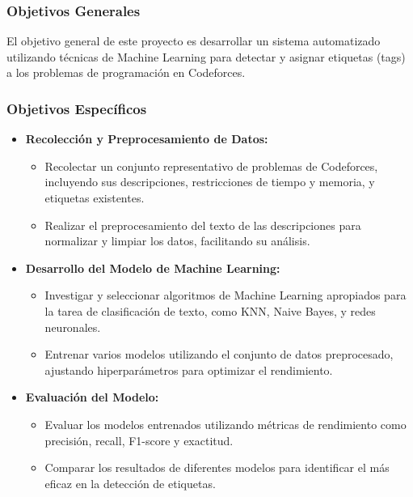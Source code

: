 \documentclass{article}
\begin{document}
\subsubsection{Objetivos Generales}

El objetivo general de este proyecto es desarrollar un sistema automatizado utilizando técnicas de Machine Learning para detectar y asignar etiquetas (tags) a los problemas de programación en Codeforces.


\subsubsection{Objetivos Específicos}

\begin{itemize}
    \item \textbf{Recolección y Preprocesamiento de Datos:}
          \begin{itemize}
              \item Recolectar un conjunto representativo de problemas de Codeforces, incluyendo sus descripciones, restricciones de tiempo y memoria, y etiquetas existentes.
              \item Realizar el preprocesamiento del texto de las descripciones para normalizar y limpiar los datos, facilitando su análisis.
          \end{itemize}
          
    \item \textbf{Desarrollo del Modelo de Machine Learning:}
          \begin{itemize}
              \item Investigar y seleccionar algoritmos de Machine Learning apropiados para la tarea de clasificación de texto, como KNN, Naive Bayes, y redes neuronales.
              \item Entrenar varios modelos utilizando el conjunto de datos preprocesado, ajustando hiperparámetros para optimizar el rendimiento.
          \end{itemize}
          
    \item \textbf{Evaluación del Modelo:}
          \begin{itemize}
              \item Evaluar los modelos entrenados utilizando métricas de rendimiento como precisión, recall, F1-score y exactitud.
              \item Comparar los resultados de diferentes modelos para identificar el más eficaz en la detección de etiquetas.
          \end{itemize}
          

\end{itemize}
\end{document}
